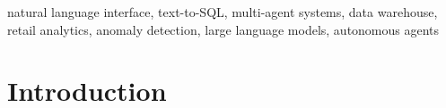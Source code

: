 \documentclass[conference]{IEEEtran}
\begin{document}
\begin{IEEEkeywords}
natural language interface, text-to-SQL, multi-agent systems,
data warehouse, retail analytics, anomaly detection,
large language models, autonomous agents
\end{IEEEkeywords}

\section{Introduction}
\label{sec:intro}



\end{document}
